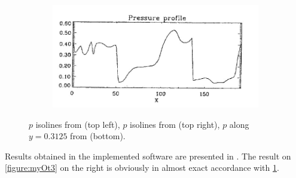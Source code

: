 \begin{figure}[H]
\\
\begin{subfigure}[b]{0.75\textwidth}\includegraphics[width=\textwidth]{img/ot/ref-zachary-pressure-profile.jpg}\end{subfigure}
\caption{$p$ isolines from \cite{blast1} (top left), $p$ isolines from \cite{blast0} (top right), $p$ along $y = 0.3125$ from \cite{blast0} (bottom).}
\label{figure:otRef}
\end{figure}

Results obtained in the implemented software are presented in . The result on \cref{figure:myOt3} on the right is obviously in almost exact accordance with \cref{figure:otRef}.


